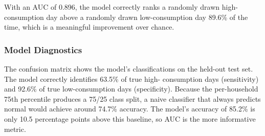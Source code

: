 \documentclass[
]{article}
\begin{document}
With an AUC of 0.896, the model correctly ranks a randomly drawn
high-consumption day above a randomly drawn low-consumption day 89.6\%
of the time, which is a meaningful improvement over chance.

\subsubsection{Model Diagnostics}\label{model-diagnostics-2}

The confusion matrix shows the model's classifications on the held-out
test set. The model correctly identifies 63.5\% of true high-
consumption days (sensitivity) and 92.6\% of true low-consumption days
(specificity). Because the per-household 75th percentile produces a
75/25 class split, a naive classifier that always predicts normal would
achieve around 74.7\% accuracy. The model's accuracy of 85.2\% is only
10.5 percentage points above this baseline, so AUC is the more
informative metric.
\end{document}
